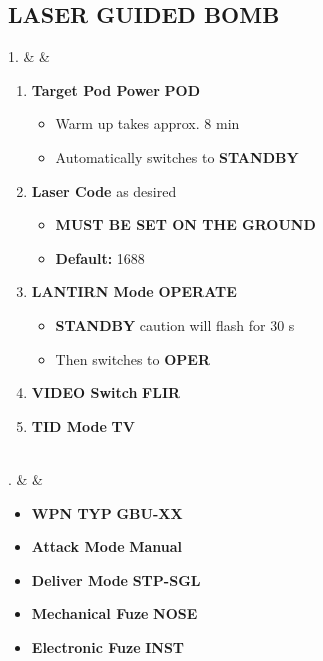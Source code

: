 \documentclass[fontInter]{TechCheck}
\begin{document}
	\subsection{LASER GUIDED BOMB}
	\begin{listlongtable}
		1. &   &
		\begin{minipage}[t]{\linewidth}
			\vspace{-7pt}
			\begin{enumerate}
				\item \textbf{Target Pod Power} \dotfill \textbf{POD}
				\begin{itemize}
					\item Warm up takes approx. 8 min
					\item Automatically switches to \textbf{STANDBY}
				\end{itemize}
				\item \textbf{Laser Code} \dotfill as desired
				\begin{itemize}
					\item \textbf{MUST BE SET ON THE GROUND}
					\item \textbf{Default:} 1688
				\end{itemize}
				\item \textbf{LANTIRN Mode} \dotfill \textbf{OPERATE}
				\begin{itemize}
					\item \textbf{STANDBY} caution will flash for 30 s
					\item Then switches to \textbf{OPER}
				\end{itemize}
				\item \textbf{VIDEO Switch} \dotfill \textbf{FLIR}
				\item \textbf{TID Mode} \dotfill \textbf{TV}
			\end{enumerate}
		\end{minipage} \\
		. &  &
		\begin{minipage}[t]{\linewidth}
			\vspace{-7pt}
			\begin{itemize}
				\item \textbf{WPN TYP} \dotfill \textbf{GBU-XX}
				\item \textbf{Attack Mode} \dotfill \textbf{Manual}
				\item \textbf{Deliver Mode} \dotfill \textbf{STP-SGL}
				\item \textbf{Mechanical Fuze} \dotfill \textbf{NOSE}
				\item \textbf{Electronic Fuze} \dotfill \textbf{INST}

\end{itemize}
\end{minipage}
\end{listlongtable}
\end{document}
